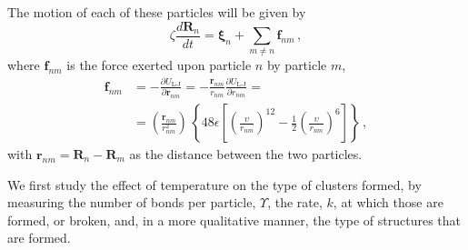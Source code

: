 \documentclass[../../main.tex]{subfiles}
\begin{document}
    The motion of each of these particles will be given by
        \begin{equation}
            \zeta \frac{d\mathbf{R}_n}{dt} = \bm{\xi}_n + \sum_{m \neq n} \mathbf{f}_{nm}\,,
        \end{equation}
    where $\mathbf{f}_{nm}$ is the force exerted upon particle $n$ by particle $m$,
        \begin{equation}\label{eq: L-J - Chain Rule-Force}
        \begin{split}
            \mathbf{f}_{nm} &= - \frac{\partial U_{\text{L-J}}}{\partial \mathbf{r}_{nm}} = -\frac{\mathbf{r}_{nm}}{r_{nm}}\frac{\partial U_{\text{L-J}}}{\partial r_{nm}} = \\
            &= \left(\frac{\mathbf{r}_{nm}}{r_{nm}^2}\right)\,\left\{ 48\epsilon \left[ \left(\frac{\upsilon}{r_{nm}}\right)^{12} - \frac{1}{2}\left(\frac{\upsilon}{r_{nm}}\right)^6 \right]\right\} \,,
        \end{split}
        \end{equation}
    with $\mathbf{r}_{nm} = \mathbf{R}_n - \mathbf{R}_m$ as the distance between the two particles.

    We first study the effect of temperature on the type of clusters formed, by measuring the number of bonds per particle, $\Upsilon$, the rate, $k$, at which those are formed, or broken, and, in a more qualitative manner, the type of structures that are formed.
    
\end{document}
